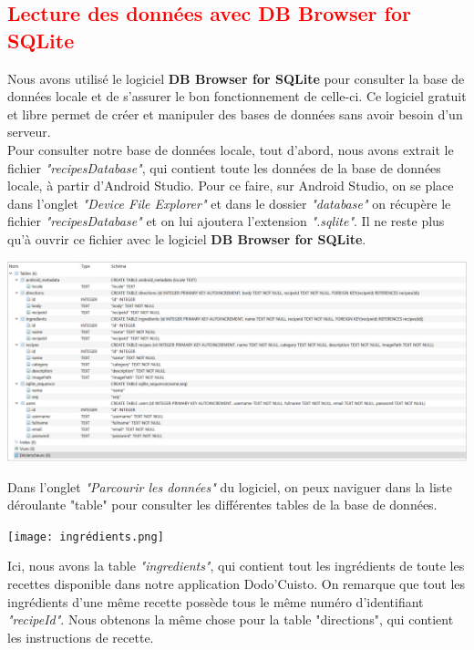 \documentclass{article}
\begin{document}
\subsection{\textcolor{red}{Lecture des données avec DB Browser for SQLite}}

Nous avons utilisé le logiciel \textbf{DB Browser for SQLite} pour consulter la base de données locale et de s’assurer le bon fonctionnement de celle-ci. Ce logiciel gratuit et libre permet de créer et manipuler des bases de données sans avoir besoin d’un serveur.\\

Pour consulter notre base de données locale, tout d’abord, nous avons extrait le fichier \textit{"recipesDatabase"}, qui contient toute les données de la base de données locale, à partir d’Android Studio. Pour ce faire, sur Android Studio, on se place dans l’onglet \textit{"Device File Explorer"} et dans le dossier \textit{"database"} on récupère le fichier \textit{"recipesDatabase"} et on lui ajoutera l’extension \textit{".sqlite"}. Il ne reste plus qu’à ouvrir ce fichier avec le logiciel \textbf{DB Browser for SQLite}.\\

\newpage

\begin{center}
    \includegraphics[scale=0.4]{vue_global_bdd.png} 
\end{center}

Dans l’onglet \textit{"Parcourir les données"} du logiciel, on peux naviguer dans la liste déroulante "table" pour consulter les différentes tables de la base de données.\\

\begin{center}
    \texttt{[image: ingrédients.png]} 
\end{center}

Ici, nous avons la table \textit{"ingredients"}, qui contient tout les ingrédients de toute les recettes disponible dans notre application Dodo’Cuisto. On remarque que tout les ingrédients d’une même recette possède tous le même numéro d’identifiant \textit{"recipeId"}. Nous obtenons la même chose pour la table "directions", qui contient les instructions de recette.\\
\end{document}
